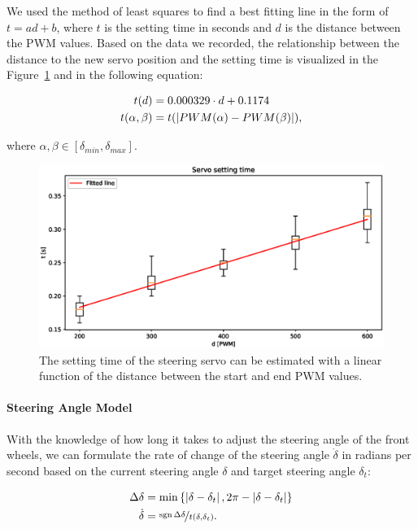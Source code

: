 We used the method of least squares to find a best fitting line in the form of $t=ad+b$, where $t$ is the setting time in seconds and $d$ is the distance between the \gls*{PWM} values. Based on the data we recorded, the relationship between the distance to the new servo position and the setting time is visualized in the Figure~\ref{fig:servo_linear_regression} and in the following equation:

\begin{equation}
\label{eq:servo_setting_time}
\begin{aligned}
t(d)&=0.000329\cdot d + 0.1174\\
t(\alpha,\beta)&=t(\left|{PWM(\alpha)-PWM(\beta)}\right|),
\end{aligned}
\end{equation}

where $\alpha,\beta\in\left[\delta_{min}, \delta_{max}\right]$.

\begin{figure}
	\includegraphics[width=\textwidth]{../img/servo_setting_time_linreg.eps}
	\caption{The setting time of the steering servo can be estimated with a linear function of the distance between the start and end PWM values.}
	\label{fig:servo_linear_regression}
\end{figure}

\paragraph{Steering Angle Model}

With the knowledge of how long it takes to adjust the steering angle of the front wheels, we can formulate the rate of change of the steering angle $\dot{\delta}$ in radians per second based on the current steering angle $\delta$ and target steering angle $\delta_t$:

\begin{equation}
\begin{aligned}
\Delta \delta&=\min\left\{\left|{\delta-\delta_t}\right|, 2\pi-\left|{\delta-\delta_t}\right|\right\}\\
\dot{\delta}&=\nicefrac{\operatorname{sgn}{} \Delta \delta}{t(\delta, \delta_t)}.
\end{aligned}
\end{equation}


